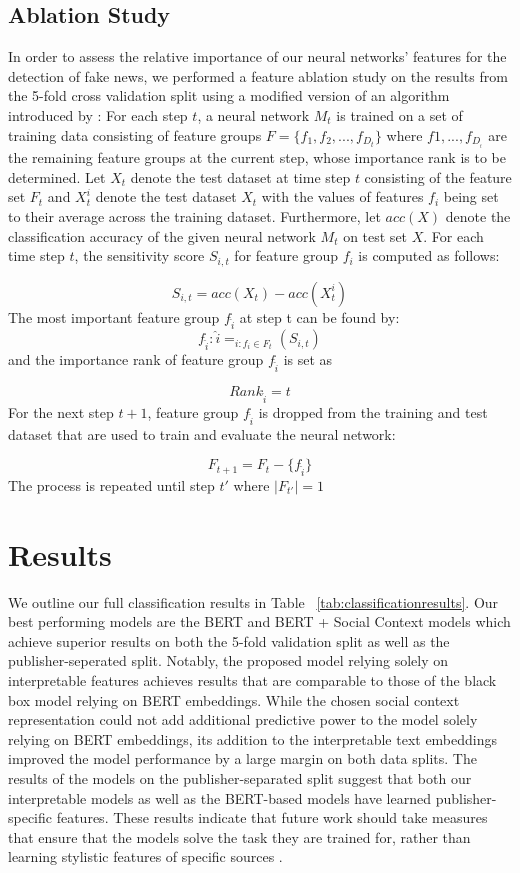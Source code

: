 \documentclass[11pt]{article}
\begin{document}
\subsection{Ablation Study}

In order to assess the relative importance of our neural networks' features for the detection of fake news, we performed a feature ablation study on the results from the 5-fold cross validation split using a modified version of an algorithm introduced by \citet{10.1007/978-3-642-13025-0_67}: 
For each step \(t\), a neural network \(M_t\) is trained on a set of training data consisting of feature groups \(F = \{f_1, f_2, ..., f_{D_t}\}\) where \(f1, ...,f_D__t\) are the remaining feature groups at the current step, whose importance rank is to be determined. Let \(X_t\) denote the test dataset at time step \(t\) consisting of the feature set \(F_t\) and \(X_t^i\) denote the test dataset \(X_t\) with the values of features \(f_i\) being set to their average across the training dataset. Furthermore, let \(acc(X)\) denote the classification accuracy of the given neural network \(M_t\) on test set \(X\). For each time step \(t\), the sensitivity score \citep{moody1994,236576} \(S_{i,t}\) for feature group \(f_i\) is computed as follows:

\[S_{i,t} = acc(X_t) - acc(X_t^i)\]
The most important feature group \(f_{\hat{i}}\) at step t can be found by:
\[f_{\hat{i}} : \hat{i} = _{i:f_i \in F_t} (S_{i,t})\]
and the importance rank of feature group \(f_{\hat{i}}\) is set as 

\[Rank_{\hat{i}} = t\]
For the next step \(t+1\), feature group \(f_\hat{i}\) is dropped from the training and test dataset that are used to train and evaluate the neural network:

\[F_{t+1} = F_t - \{f_{\hat{i}}\}\]
The process is repeated until step \(t'\) where \(|F_{t'}| = 1\)


\section{Results}

We outline our full classification results in Table ~\ref{tab:classificationresults}. Our best performing models are the BERT and BERT + Social Context models which achieve superior results on both the 5-fold validation split as well as the publisher-seperated split.
Notably, the proposed model relying solely on interpretable features achieves results that are comparable to those of the black box model relying on BERT embeddings. While the chosen social context representation could not add additional predictive power to the model solely relying on BERT embeddings, its addition to the interpretable text embeddings improved the model performance by a large margin on both data splits. The results of the models on the publisher-separated split suggest that both our interpretable models as well as the BERT-based models have learned publisher-specific features. These results indicate that future work should take measures that ensure that the models solve the task they are trained for, rather than learning stylistic features of specific sources 
\citep[see][for a related finding in the domain of prediction of political ideology]{DBLP:journals/corr/abs-2010-05338}.
\end{document}
